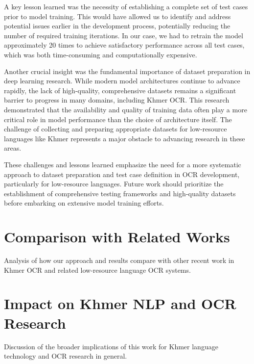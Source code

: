 A key lesson learned was the necessity of establishing a complete set of test cases prior to model training. 
This would have allowed us to identify and address potential issues earlier in the development process, 
potentially reducing the number of required training iterations. In our case, we had to retrain the model 
approximately 20 times to achieve satisfactory performance across all test cases, which was both time-consuming 
and computationally expensive.

Another crucial insight was the fundamental importance of dataset preparation in deep learning research. 
While modern model architectures continue to advance rapidly, the lack of high-quality, comprehensive datasets 
remains a significant barrier to progress in many domains, including Khmer OCR. This research demonstrated that 
the availability and quality of training data often play a more critical role in model performance than the choice 
of architecture itself. The challenge of collecting and preparing appropriate datasets for low-resource languages 
like Khmer represents a major obstacle to advancing research in these areas.

These challenges and lessons learned emphasize the need for a more systematic approach to dataset preparation 
and test case definition in OCR development, particularly for low-resource languages. Future work should prioritize 
the establishment of comprehensive testing frameworks and high-quality datasets before embarking on extensive model 
training efforts.

\section{Comparison with Related Works}
\label{sec:related-works}
Analysis of how our approach and results compare with other recent work in Khmer OCR and related low-resource language OCR systems.

\section{Impact on Khmer NLP and OCR Research}
\label{sec:impact}
Discussion of the broader implications of this work for Khmer language technology and OCR research in general.
